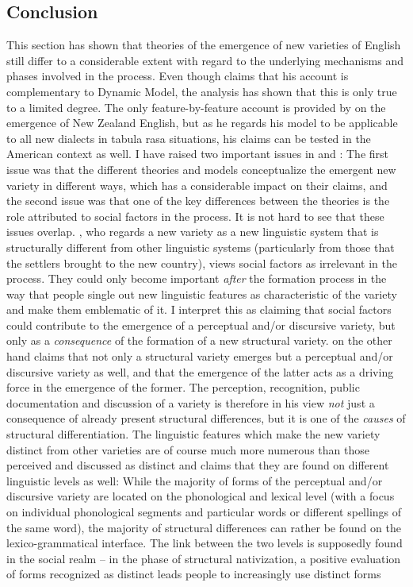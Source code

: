 \subsection{Conclusion}
\label{bkm:Ref527366308}\hypertarget{Toc63021209}{}\label{bkm:Ref527389617}
This section has shown that theories of the emergence of new varieties of English still differ to a considerable extent with regard to the underlying mechanisms and phases involved in the process. Even though \citet{Kretzschmar2014} claims that his account is complementary to  Dynamic Model, the analysis has shown that this is only true to a limited degree. The only feature-by-feature account is provided by \citet{Trudgill2004} on the emergence of New Zealand English, but as he regards his model to be applicable to all new dialects in tabula rasa situations, his claims can be tested in the American context as well. I have raised two important issues in  and : The first issue was that the different theories and models conceptualize the emergent new variety in different ways, which has a considerable impact on their claims, and the second issue was that one of the key differences between the theories is the role attributed to social factors in the process. It is not hard to see that these issues overlap. \citet{Trudgill2004}, who regards a new variety as a new linguistic system that is structurally different from other linguistic systems (particularly from those that the settlers brought to the new country), views social factors as irrelevant in the process. They could only become important \emph{after} the formation process in the way that people single out new linguistic features as characteristic of the variety and make them emblematic of it. I interpret this as claiming that social factors could contribute to the emergence of a perceptual and/or discursive variety, but only as a \emph{consequence} of the formation of a new structural variety. \citet{Schneider2007} on the other hand claims that not only a structural variety emerges but a perceptual and/or discursive variety as well, and that the emergence of the latter acts as a driving force in the emergence of the former. The perception, recognition, public documentation and discussion of a variety is therefore in his view \emph{not} just a consequence of already present structural differences, but it is one of the \emph{causes} of structural differentiation. The linguistic features which make the new variety distinct from other varieties are of course much more numerous than those perceived and discussed as distinct and \citet{Schneider2007} claims that they are found on different linguistic levels as well: While the majority of forms of the perceptual and/or discursive variety are located on the phonological and lexical level (with a focus on individual phonological segments and particular words or different spellings of the same word), the majority of structural differences can rather be found on the lexico-grammatical interface. The link between the two levels is supposedly found in the social realm – in the phase of structural nativization, a positive evaluation of forms recognized as distinct leads people to increasingly use distinct forms 